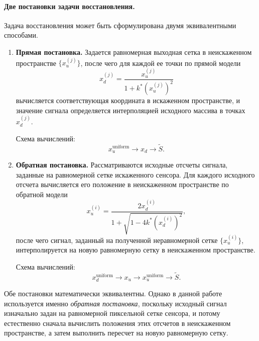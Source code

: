 \paragraph{Две постановки задачи восстановления.}

Задача восстановления может быть сформулирована двумя эквивалентными способами.

\begin{enumerate}
\item \textbf{Прямая постановка.}  
Задается равномерная выходная сетка в неискаженном пространстве $\{x_u^{(j)}\}$, после чего для каждой ее точки по прямой модели
\begin{equation}
x_d^{(j)} = \frac{x_u^{(j)}}{1 + k^*\left(x_u^{(j)}\right)^2}
\label{eq:restore_forward_scheme}
\end{equation}
вычисляется соответствующая координата в искаженном пространстве, и значение сигнала определяется интерполяцией исходного массива в точках $x_d^{(j)}$.

Схема вычислений:
\begin{equation}
x_u^{\mathrm{uniform}} \longrightarrow x_d \longrightarrow\tilde{S}.
\label{eq:restore_scheme_forward}
\end{equation}

\item \textbf{Обратная постановка.}  
Рассматриваются исходные отсчеты сигнала, заданные на равномерной сетке искаженного сенсора. Для каждого исходного отсчета вычисляется его положение в неискаженном пространстве по обратной модели
\begin{equation}
x_u^{(i)} =
\frac{2x_d^{(i)}}{1 + \sqrt{1 - 4k^*\left(x_d^{(i)}\right)^2}},
\label{eq:restore_inverse_scheme}
\end{equation}
после чего сигнал, заданный на полученной неравномерной сетке $\{x_u^{(i)}\}$, интерполируется на новую равномерную сетку в неискаженном пространстве.

Схема вычислений:
\begin{equation}
x_d^{\mathrm{uniform}} \longrightarrow x_u \longrightarrow x_u^{\mathrm{uniform}} \longrightarrow \tilde{S}.
\label{eq:restore_scheme_inverse}
\end{equation}
\end{enumerate}

Обе постановки математически эквивалентны. Однако в данной работе используется именно \textit{обратная постановка}, поскольку исходный сигнал изначально задан на равномерной пиксельной сетке сенсора, и потому естественно сначала вычислить положения этих отсчетов в неискаженном пространстве, а затем выполнить пересчет на новую равномерную сетку.

